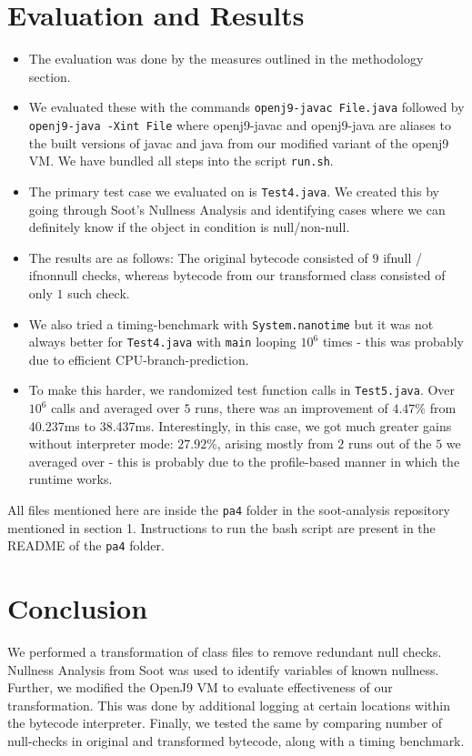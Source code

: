 \documentclass{article}
\begin{document}
\section{Evaluation and Results}

\begin{itemize}
\item The evaluation was done by the measures outlined in the methodology section.
\item We evaluated these with the commands \texttt{openj9-javac  File.java} followed by \texttt{openj9-java -Xint File} where openj9-javac and openj9-java are aliases to the built versions of javac and java from our modified variant of the openj9 VM. We have bundled all steps into the script \texttt{run.sh}.
\item The primary test case we evaluated on is \texttt{Test4.java}. We created this by going through Soot's Nullness Analysis and identifying cases where we can definitely know if the object in condition is null/non-null.
\item The results are as follows: The original bytecode consisted of $9$ ifnull / ifnonnull checks, whereas bytecode from our transformed class consisted of only $1$ such check.
\item We also tried a timing-benchmark with \texttt{System.nanotime} but it was not always better for \texttt{Test4.java} with \texttt{main} looping $10^6$ times - this was probably due to efficient CPU-branch-prediction.
\item To make this harder, we randomized test function calls in \texttt{Test5.java}. Over $10^6$ calls and averaged over $5$ runs, there was an improvement of $4.47\%$ from 40.237ms to 38.437ms. Interestingly, in this case, we got much greater gains without interpreter mode: $27.92\%$, arising mostly from $2$ runs out of the $5$ we averaged over - this is probably due to the profile-based manner in which the runtime works.
\end{itemize}

All files mentioned here are inside the \texttt{pa4} folder in the soot-analysis repository mentioned in section 1. Instructions to run the bash script are present in the README of the \texttt{pa4} folder.

\section{Conclusion}

We performed a transformation of class files to remove redundant null checks. Nullness Analysis from Soot was used to identify variables of known nullness. Further, we modified the OpenJ9 VM to evaluate effectiveness of our transformation. This was done by additional logging at certain locations within the bytecode interpreter. Finally, we tested the same by comparing number of null-checks in original and transformed bytecode, along with a timing benchmark.
\end{document}
